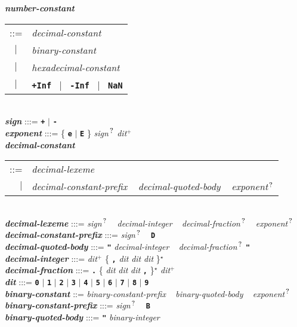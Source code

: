 \documentclass[12pt]{article}
\newcommand{\TT}[1]{{\tt \bfseries #1}}
\newcommand{\STAR}{{\Large $^\star$}}
\newcommand{\PLUS}[1][]{{$^{+#1}$}}
\newcommand{\QMARK}{{$^{\,\mbox{\footnotesize ?}}$}}
\newcommand{\ttkey}[1]{{\tt \bfseries #1}}
\newcommand{\emkey}[1]{{\em \bfseries #1}}
\newenvironment{indpar}[1][0.3in]%
	{\begin{list}{}%
		     {\setlength{\itemsep}{0in}%
		      \setlength{\topsep}{0in}%
		      \setlength{\parsep}{1ex}%
		      \setlength{\labelwidth}{#1}%
		      \setlength{\leftmargin}{#1}%
		      \addtolength{\leftmargin}{\labelsep}}%
	 \item}%
	{\end{list}}
\begin{document}
\begin{indpar}
\emkey{number-constant}\label{NUMBER-CONSTANT}
    \begin{tabular}[t]{@{}cl}
    ::= & {\em decimal-constant} \\
    $|$ & {\em binary-constant} \\
    $|$ & {\em hexadecimal-constant} \\
    $|$ & \TT{+Inf}\index{Inf@\TT{+Inf}}
          ~$|$~ \TT{-Inf}\index{Inf@\TT{-Inf}}
          ~$|$~ \ttkey{NaN}
    \end{tabular}
\\[0.5ex]
\emkey{sign} :::= \TT{+} $|$ \TT{-} \\
\emkey{exponent} :::=
	\{ \TT{e} $|$ \TT{E} \} {\em sign}\QMARK{} {\em dit}\PLUS{}
\\[0.5ex]
\emkey{decimal-constant} \begin{tabular}[t]{@{}rl@{}}
                         ::= & {\em decimal-lexeme} \\
			 $|$ & {\em decimal-constant-prefix} ~
			       {\em decimal-quoted-body} ~
			       {\em exponent}\QMARK{}
			 \end{tabular}
\\[0.5ex]
\emkey{decimal-lexeme} :::= {\em sign}\QMARK{} ~ {\em decimal-integer} ~
			    {\em decimal-fraction}\QMARK{} ~
                            {\em exponent}\QMARK{}
\\[0.5ex]
\emkey{decimal-constant-prefix} :::= {\em sign}\QMARK{} ~ \TT{D}
\\[0.5ex]
\emkey{decimal-quoted-body} :::= \TT{"} {\em decimal-integer} ~
				 {\em decimal-fraction}\QMARK{} \TT{"}
\\[0.5ex]
\emkey{decimal-integer}
    :::= {\em dit}\PLUS{} 
         \{ \TT{,} {\em dit} {\em dit} {\em dit} \}\STAR{} \\
\emkey{decimal-fraction} :::=
    \TT{.} \{ {\em dit} {\em dit} {\em dit} \TT{,} \}\STAR{}
           {\em dit}\PLUS{} \\
\emkey{dit}\label{DIT}
	:::= \TT{0} $|$ \TT{1} $|$ \TT{2} $|$ \TT{3} $|$ \TT{4}
                    $|$ \TT{5} $|$ \TT{6} $|$ \TT{7} $|$ \TT{8} $|$ \TT{9}
 \\[0.5ex]
\emkey{binary-constant} ::= {\em binary-constant-prefix} ~
                              {\em binary-quoted-body} ~
			      {\em exponent}\QMARK{}
\\[0.5ex]
\emkey{binary-constant-prefix} :::= {\em sign}\QMARK{} ~ \TT{B}
\\[0.5ex]
\emkey{binary-quoted-body} :::= \TT{"} {\em binary-integer} ~

\end{indpar}
\end{document}
